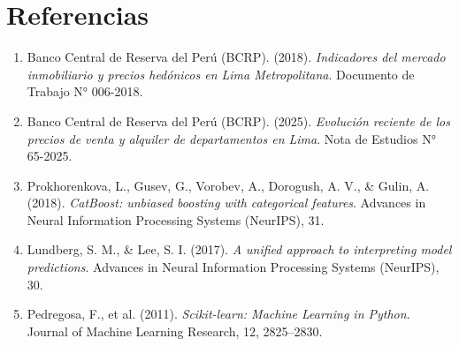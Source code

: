 \documentclass[11pt,a4paper]{article}
\begin{document}
\section{Referencias}
\begin{enumerate}[leftmargin=1.5cm]
    \item Banco Central de Reserva del Perú (BCRP). (2018). \textit{Indicadores del mercado inmobiliario y precios hedónicos en Lima Metropolitana}. Documento de Trabajo N° 006-2018.
    \item Banco Central de Reserva del Perú (BCRP). (2025). \textit{Evolución reciente de los precios de venta y alquiler de departamentos en Lima}. Nota de Estudios N° 65-2025.
    \item Prokhorenkova, L., Gusev, G., Vorobev, A., Dorogush, A. V., \& Gulin, A. (2018). \textit{CatBoost: unbiased boosting with categorical features}. Advances in Neural Information Processing Systems (NeurIPS), 31.
    \item Lundberg, S. M., \& Lee, S. I. (2017). \textit{A unified approach to interpreting model predictions}. Advances in Neural Information Processing Systems (NeurIPS), 30.
    \item Pedregosa, F., et al. (2011). \textit{Scikit-learn: Machine Learning in Python}. Journal of Machine Learning Research, 12, 2825--2830.
\end{enumerate}
\end{document}
